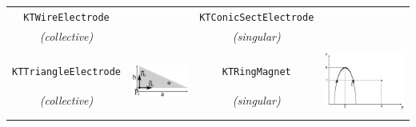 \documentclass[11pt,a4paper,oneside]{article}
\begin{document}
\begin{table}
\begin{tabular}{|c|c||c|c|}
\texttt{KTWireElectrode} & & \texttt{KTConicSectElectrode} & \\
\it{(collective)}& & \it{(singular)} & \\
& & & \\
\hline
& \multirow{3}{*}{\includegraphics[scale=.18]{triangle.ps}} & &
\multirow{3}{*}{\includegraphics[scale=.18]{loop.ps}} \\ 
\texttt{KTTriangleElectrode} & & \texttt{KTRingMagnet} & \\
\it{(collective)}& & \it{(singular)} & \\
& & & \\
\hline

\end{tabular}
\end{table}
\end{document}
